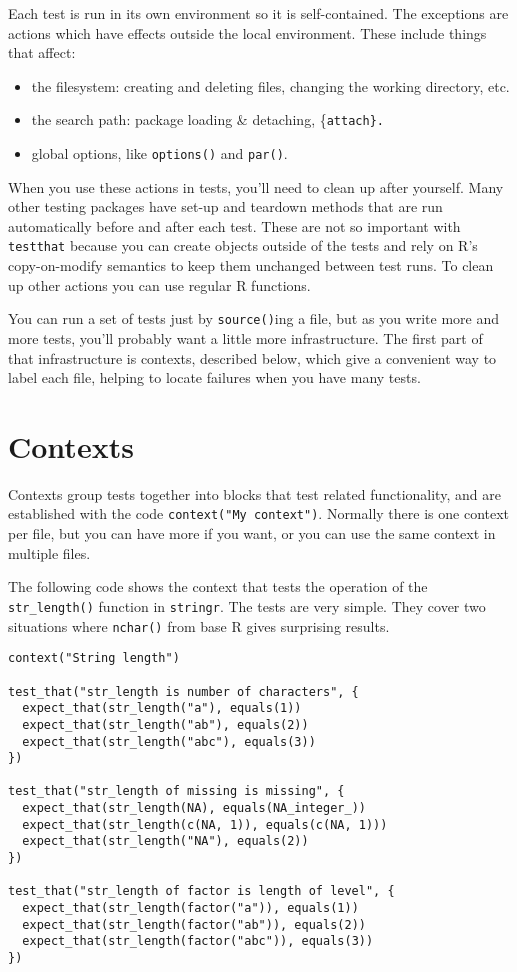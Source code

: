 Each test is run in its own environment so it is self-contained. The
exceptions are actions which have effects outside the local environment.
These include things that affect:

\begin{itemize}
\item
  the filesystem: creating and deleting files, changing the working
  directory, etc.
\item
  the search path: package loading \& detaching, \{\tt attach\}.
\item
  global options, like \texttt{options()} and \texttt{par()}.
\end{itemize}

When you use these actions in tests, you'll need to clean up after
yourself. Many other testing packages have set-up and teardown methods
that are run automatically before and after each test. These are not so
important with \texttt{testthat} because you can create objects outside
of the tests and rely on R's copy-on-modify semantics to keep them
unchanged between test runs. To clean up other actions you can use
regular R functions.

You can run a set of tests just by \texttt{source()}ing a file, but as
you write more and more tests, you'll probably want a little more
infrastructure. The first part of that infrastructure is contexts,
described below, which give a convenient way to label each file, helping
to locate failures when you have many tests.

\section{Contexts}

Contexts group tests together into blocks that test related
functionality, and are established with the code
\texttt{context("My context")}. Normally there is one context per file,
but you can have more if you want, or you can use the same context in
multiple files.

The following code shows the context that tests the operation of the
\texttt{str\_length()} function in \texttt{stringr}. The tests are very
simple. They cover two situations where \texttt{nchar()} from base R
gives surprising results.

\begin{verbatim}
context("String length")

test_that("str_length is number of characters", {
  expect_that(str_length("a"), equals(1))
  expect_that(str_length("ab"), equals(2))
  expect_that(str_length("abc"), equals(3))
})

test_that("str_length of missing is missing", {
  expect_that(str_length(NA), equals(NA_integer_))
  expect_that(str_length(c(NA, 1)), equals(c(NA, 1)))
  expect_that(str_length("NA"), equals(2))
})

test_that("str_length of factor is length of level", {
  expect_that(str_length(factor("a")), equals(1))
  expect_that(str_length(factor("ab")), equals(2))
  expect_that(str_length(factor("abc")), equals(3))
})
\end{verbatim}

